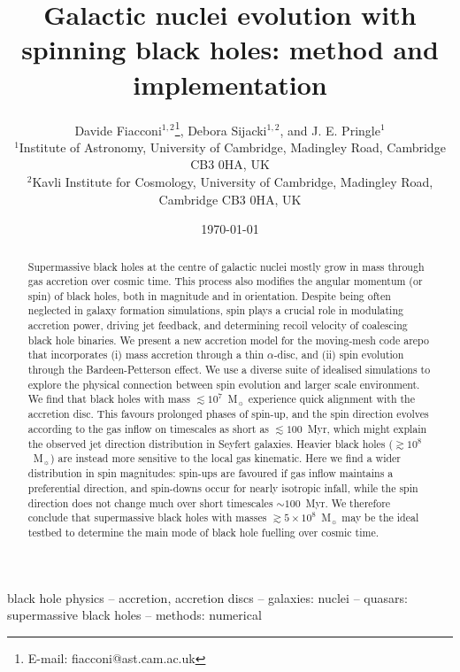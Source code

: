 \documentclass[a4paper,fleqn,usenatbib]{mnras}
\title[SMBH spin in galactic nuclei simulations]{Galactic nuclei evolution with spinning black holes: method and implementation}
\author[Fiacconi, Sijacki, \& Pringle]{Davide Fiacconi$^{1,2}$\thanks{E-mail: fiacconi@ast.cam.ac.uk}, Debora Sijacki$^{1,2}$, and J. E. Pringle$^{1}$\\
$^{1}$Institute of Astronomy, University of Cambridge, Madingley Road, Cambridge CB3 0HA, UK\\
$^{2}$Kavli Institute for Cosmology, University of Cambridge, Madingley Road, Cambridge CB3 0HA, UK\\
}
\begin{document}
\date{\today}

\pagerange{\pageref{firstpage}--\pageref{lastpage}} 

\maketitle

\label{firstpage}



\begin{abstract}
Supermassive black holes at the centre of galactic nuclei mostly grow in mass through gas accretion over cosmic time.
This process also modifies the angular momentum (or spin) of black holes, both in magnitude and in orientation.
Despite being often neglected in galaxy formation simulations, spin plays a crucial role in modulating accretion power, driving jet feedback, and determining recoil velocity of coalescing black hole binaries.
We present a new accretion model for the moving-mesh code {\sc arepo} that incorporates (i) mass accretion through a thin $\alpha$-disc, and (ii) spin evolution through the Bardeen-Petterson effect.
We use a diverse suite of idealised simulations to explore the physical connection between spin evolution and larger scale environment.
We find that black holes with mass $\lesssim 10^{7}$~M$_{\sun}$ experience quick alignment with the accretion disc.
This favours prolonged phases of spin-up, and the spin direction evolves according to the gas inflow on timescales as short as $\lesssim 100$~Myr, which might explain the observed jet direction distribution in Seyfert galaxies.
Heavier black holes ($\gtrsim 10^{8}$~M$_{\sun}$) are instead more sensitive to the local gas kinematic.
Here we find a wider distribution in spin magnitudes: spin-ups are favoured if gas inflow maintains a preferential direction, and spin-downs occur for nearly isotropic infall, while the spin direction does not change much over short timescales $\sim 100$~Myr.
We therefore conclude that supermassive black holes with masses $\gtrsim 5 \times 10^{8}$~M$_{\sun}$ may be the ideal testbed to determine the main mode of black hole fuelling over cosmic time.
\end{abstract}

\begin{keywords}
black hole physics -- accretion, accretion discs -- galaxies: nuclei -- quasars: supermassive black holes -- methods: numerical
\end{keywords}
\end{document}
